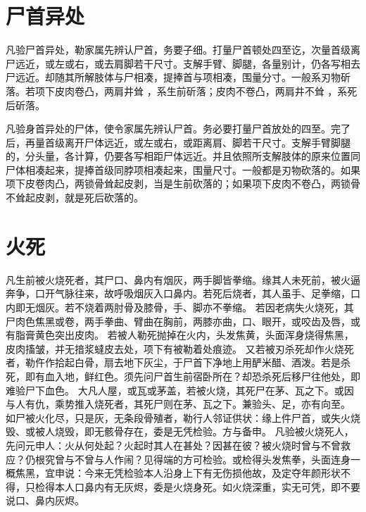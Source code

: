 \documentclass[12pt,UTF8]{ctexbook}
\begin{document}
\chapter{尸首异处}

凡验尸首异处，勒家属先辨认尸首，务要子细。打量尸首顿处四至讫，次量首级离尸远近，或左或右，或去肩脚若干尺寸。支解手臂、脚腿，各量别计，仍各写相去尸远近。却随其所解肢体与尸相凑，提捧首与项相凑，围量分寸。一般系刃物斫落。若项下皮肉卷凸，两肩井耸 ，系生前斫落；皮肉不卷凸，两肩井不耸 ，系死后斫落。



凡验身首异处的尸体，使令家属先辨认尸首。务必要打量尸首放处的四至。完了后，再量首级离开尸体远近，或左或右，或距离肩、脚若干尺寸。支解手臂脚腿的，分头量，各计算，仍要各写相距尸体远近。并且依照所支解肢体的原来位置同尸体相凑起来，提捧首级同脖项相凑起来，围量尺寸。一般都是刃物砍落的。如果项下皮卷肉凸，两锁骨耸起皮剥，当是生前砍落的；如果项下皮肉不卷凸，两锁骨不耸起皮剥，就是死后砍落的。


\chapter{火死}

凡生前被火烧死者，其尸口、鼻内有烟灰，两手脚皆拳缩。缘其人未死前，被火逼奔争，口开气脉往来，故呼吸烟灰入口鼻内。若死后烧者，其人虽手、足拳缩，口内即无烟灰。若不烧着两肘骨及膝骨，手、脚亦不拳缩。
若因老病失火烧死，其尸肉色焦黑或卷，两手拳曲、臂曲在胸前，两膝亦曲，口、眼开，或咬齿及唇，或有脂膏黄色突出皮肉。
若被人勒死抛掉在火内，头发焦黄，头面浑身烧得焦黑，皮肉搐皱，并无揞浆蟽皮去处，项下有被勒着处痕迹。
又若被刃杀死却作火烧死者，勒仵作拾起白骨，扇去地下灰尘，于尸首下净地上用酽米醋、酒泼。若是杀死，即有血入地，鲜红色。须先问尸首生前宿卧所在？却恐杀死后移尸往他处，即难验尸下血色。
大凡人屋，或瓦或茅盖，若被火烧，其死尸在茅、瓦之下。或因与人有仇，乘势推入烧死者，其死尸则在茅、瓦之下。兼验头、足，亦有向至。
如尸被火化尽，只是灰，无条段骨殖者，勒行人邻证供状：缘上件尸首，或失火烧毁、或被人烧毁，即无骸骨存在，委是无凭检验。方与备申。
凡验被火烧死人，先问元申人：火从何处起？火起时其人在甚处？因甚在彼？被火烧时曾与不曾救应？仍根究曾与不曾与人作闹？见得端的方可检验。或检得头发焦拳，头面连身一概焦黑，宜申说：今来无凭检验本人沿身上下有无伤损他故，及定夺年颜形状不得，只检得本人口鼻内有无灰烬，委是火烧身死。如火烧深重，实无可凭，即不要说口、鼻内灰烬。
\end{document}
